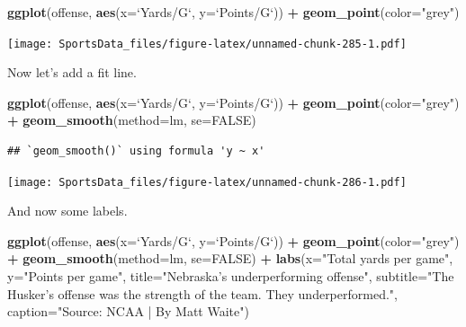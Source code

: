 \documentclass[
]{book}
\newenvironment{Shaded}{\begin{snugshade}}{\end{snugshade}}
\newcommand{\DataTypeTok}[1]{\textcolor[rgb]{0.13,0.29,0.53}{#1}}
\newcommand{\KeywordTok}[1]{\textcolor[rgb]{0.13,0.29,0.53}{\textbf{#1}}}
\newcommand{\NormalTok}[1]{#1}
\newcommand{\OperatorTok}[1]{\textcolor[rgb]{0.81,0.36,0.00}{\textbf{#1}}}
\newcommand{\OtherTok}[1]{\textcolor[rgb]{0.56,0.35,0.01}{#1}}
\newcommand{\StringTok}[1]{\textcolor[rgb]{0.31,0.60,0.02}{#1}}
\begin{document}
\begin{Shaded}
\begin{Highlighting}[]
\KeywordTok{ggplot}\NormalTok{(offense, }\KeywordTok{aes}\NormalTok{(}\DataTypeTok{x=}\StringTok{`}\DataTypeTok{Yards/G}\StringTok{`}\NormalTok{, }\DataTypeTok{y=}\StringTok{`}\DataTypeTok{Points/G}\StringTok{`}\NormalTok{)) }\OperatorTok{+}\StringTok{ }
\StringTok{  }\KeywordTok{geom_point}\NormalTok{(}\DataTypeTok{color=}\StringTok{"grey"}\NormalTok{)}
\end{Highlighting}
\end{Shaded}

\texttt{[image: SportsData\_files/figure-latex/unnamed-chunk-285-1.pdf]}

Now let's add a fit line.

\begin{Shaded}
\begin{Highlighting}[]
\KeywordTok{ggplot}\NormalTok{(offense, }\KeywordTok{aes}\NormalTok{(}\DataTypeTok{x=}\StringTok{`}\DataTypeTok{Yards/G}\StringTok{`}\NormalTok{, }\DataTypeTok{y=}\StringTok{`}\DataTypeTok{Points/G}\StringTok{`}\NormalTok{)) }\OperatorTok{+}\StringTok{ }
\StringTok{  }\KeywordTok{geom_point}\NormalTok{(}\DataTypeTok{color=}\StringTok{"grey"}\NormalTok{) }\OperatorTok{+}\StringTok{ }\KeywordTok{geom_smooth}\NormalTok{(}\DataTypeTok{method=}\NormalTok{lm, }\DataTypeTok{se=}\OtherTok{FALSE}\NormalTok{)}
\end{Highlighting}
\end{Shaded}

\begin{verbatim}
## `geom_smooth()` using formula 'y ~ x'
\end{verbatim}

\texttt{[image: SportsData\_files/figure-latex/unnamed-chunk-286-1.pdf]}

And now some labels.

\begin{Shaded}
\begin{Highlighting}[]
\KeywordTok{ggplot}\NormalTok{(offense, }\KeywordTok{aes}\NormalTok{(}\DataTypeTok{x=}\StringTok{`}\DataTypeTok{Yards/G}\StringTok{`}\NormalTok{, }\DataTypeTok{y=}\StringTok{`}\DataTypeTok{Points/G}\StringTok{`}\NormalTok{)) }\OperatorTok{+}\StringTok{ }
\StringTok{  }\KeywordTok{geom_point}\NormalTok{(}\DataTypeTok{color=}\StringTok{"grey"}\NormalTok{) }\OperatorTok{+}\StringTok{ }\KeywordTok{geom_smooth}\NormalTok{(}\DataTypeTok{method=}\NormalTok{lm, }\DataTypeTok{se=}\OtherTok{FALSE}\NormalTok{) }\OperatorTok{+}\StringTok{ }
\StringTok{  }\KeywordTok{labs}\NormalTok{(}\DataTypeTok{x=}\StringTok{"Total yards per game"}\NormalTok{, }\DataTypeTok{y=}\StringTok{"Points per game"}\NormalTok{, }\DataTypeTok{title=}\StringTok{"Nebraska's underperforming offense"}\NormalTok{, }\DataTypeTok{subtitle=}\StringTok{"The Husker's offense was the strength of the team. They underperformed."}\NormalTok{, }\DataTypeTok{caption=}\StringTok{"Source: NCAA | By Matt Waite"}\NormalTok{)}
\end{Highlighting}
\end{Shaded}
\end{document}

